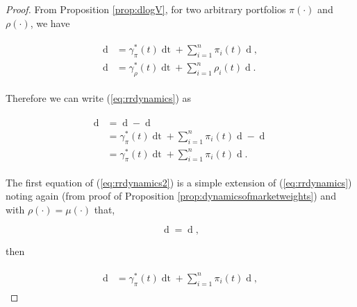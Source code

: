 \documentclass[british]{amsart} \usepackage{lmodern}
\numberwithin{equation}{section} \numberwithin{figure}{section}
\theoremstyle{plain} \newtheorem{thm}{\protect\theoremname}[section]
\theoremstyle{definition} \newtheorem{defn}[thm]{\protect\definitionname}
\theoremstyle{plain} \newtheorem{assumption}[thm]{\protect\assumptionname}
\theoremstyle{plain} \newtheorem{lem}[thm]{\protect\lemmaname}
\theoremstyle{plain} \newtheorem{prop}[thm]{\protect\propositionname}
\theoremstyle{remark} \newtheorem{rem}[thm]{\protect\remarkname}
\theoremstyle{plain} \newtheorem{cor}[thm]{\protect\corollaryname}
\renewcommand{\d}[1]{\mathop{\mathrm{d}{#1}}}
\newcommand{\Vmu}{V^{\mu}}
\begin{document}
\begin{proof}

  From Proposition \ref{prop:dlogV}, for two arbitrary portfolios $\pi(\cdot)$
  and $\rho(\cdot)$, we have

  \begin{gather} 
    \begin{split} 
      \d{\log V^{\pi}(t)} &= 
          \gamma_{\pi}^{*}(t)\d{t} + \sum_{i=1}^{n} \pi_{i}(t)\d{\log{X_{i}(t)}}, \\
      \d{\log V^{\rho}(t)} &= 
          \gamma_{\rho}^{*}(t)\d{t} + \sum_{i=1}^{n} \rho_{i}(t) \d{\log{X_{i}(t)}}.
     \end{split} 
  \end{gather}

  Therefore we can write (\ref{eq:rrdynamics}) as

  \begin{gather*} 
    \begin{split} 
      \d{\log{ \left( \frac{ V^{\pi}(t) }{V^{\rho}(t) } \right) }} 
      &=  \d{\log V^{\pi}(t)} - \d{\log V^{\rho}(t)} \\
      &=  \gamma_{\pi}^{*}(t)\d{t} + \sum_{i=1}^{n} \pi_{i}(t) \d{\log{X_{i}(t)}} -
          \d{\log V^{\rho}(t)} \\
      &=  \gamma_{\pi}^{*}(t)\d{t} + \sum_{i=1}^{n} \pi_{i}(t) 
           \d{\log{ \left( \frac{ X_{i}(t) }{ V^{\rho}(t)} \right) }}.
    \end{split} 
  \end{gather*}

  The first equation of (\ref{eq:rrdynamics2}) is a simple extension of
  (\ref{eq:rrdynamics}) noting again (from proof of Proposition
  \ref{prop:dynamicsofmarketweights}) and with $\rho(\cdot)=\mu(\cdot)$ that,

  \begin{equation*} 
      \d{\log{\mu_{i}(t)}} 
        = \d{\log{ \left( \frac{ X_{i}(t) }{ \Vmu(t) } \right)}},
  \end{equation*}

  then

  \begin{gather} 
    \label{eq:eqrrdynamicseq1}
    \begin{split} 
      \d{\log{ \left( \frac{ V^{\pi}(t) }{V^{\rho}(t) } \right) }} 
      &=  \gamma_{\pi}^{*}(t)\d{t} + \sum_{i=1}^{n}\pi_{i}(t)\d{\log{\mu_{i}(t)}},
    \end{split} 
  \end{gather}


\end{proof}
\end{document}
